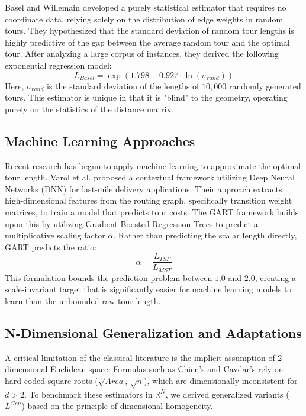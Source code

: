 \documentclass{article}
\begin{document}
Basel and Willemain \cite{baselwillemain} developed a purely statistical estimator that requires no coordinate data, relying solely on the distribution of edge weights in random tours. They hypothesized that the standard deviation of random tour lengths is highly predictive of the gap between the average random tour and the optimal tour. After analyzing a large corpus of instances, they derived the following exponential regression model:
\begin{equation}
L_{Basel} = \exp(1.798 + 0.927 \cdot \ln(\sigma_{rand}))
\end{equation}
Here, $\sigma_{rand}$ is the standard deviation of the lengths of $10,000$ randomly generated tours. This estimator is unique in that it is "blind" to the geometry, operating purely on the statistics of the distance matrix.

\subsection{Machine Learning Approaches}

Recent research has begun to apply machine learning to approximate the optimal tour length. Varol et al. \cite{varol2024} proposed a contextual framework utilizing Deep Neural Networks (DNN) for last-mile delivery applications. Their approach extracts high-dimensional features from the routing graph, specifically transition weight matrices, to train a model that predicts tour costs. The GART framework \cite{gart2025} builds upon this by utilizing Gradient Boosted Regression Trees to predict a multiplicative scaling factor $\alpha$. Rather than predicting the scalar length directly, GART predicts the ratio:
\begin{equation}
\alpha = \frac{L_{TSP}}{L_{MST}}
\end{equation}
This formulation bounds the prediction problem between $1.0$ and $2.0$, creating a scale-invariant target that is significantly easier for machine learning models to learn than the unbounded raw tour length.

\subsection{N-Dimensional Generalization and Adaptations}
\label{subsec:ndim_scaling}

A critical limitation of the classical literature is the implicit assumption of 2-dimensional Euclidean space. Formulas such as Chien's and Cavdar's rely on hard-coded square roots ($\sqrt{Area}$, $\sqrt{n}$), which are dimensionally inconsistent for $d > 2$. To benchmark these estimators in $\mathbb{R}^N$, we derived generalized variants ($L^{Gen}$) based on the principle of dimensional homogeneity.
\end{document}
